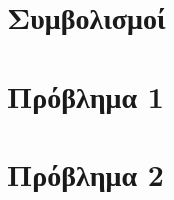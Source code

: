 \newcommand{\reporttitle}{Πρώτη Εργασία --- Διαίρει \& Βασίλευε}
\newcommand{\reportauthorOne}{Καπετάνιος Αντώνιος}
\newcommand{\cidOne}{10417}
\newcommand{\reportauthorTwo}{Κολιαμήτρα, Ελευθερία}
\newcommand{\cidTwo}{10422}
\newcommand{\reportauthorThree}{Μπαξεβάνης Γεώργιος}
\newcommand{\cidThree}{10301}




\setcounter{secnumdepth}{-1}



	

	\gr{\tableofcontents}
	\newpage
	\chapter{Συμβολισμοί}
	
	\newpage

	\chapter{Πρόβλημα 1}
		
	\newpage
	\chapter{Πρόβλημα 2}
        

	\newpage
	\printbibliography


